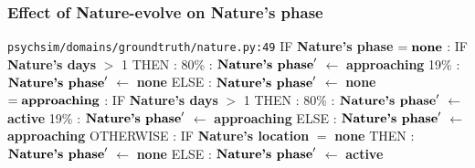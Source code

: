 \documentclass{article}%
\begin{document}
\subsubsection{Effect of Nature{-}evolve on Nature's phase}%
\label{ssubsec:Effect of Nature{-}evolve on Nature's phase}%
\begin{flushleft}%
\verb|psychsim/domains/groundtruth/nature.py:49|%
\linebreak%
IF %
\textbf{Nature's phase}%
\linebreak%
\hspace*{2em}%
$= \mbox{\textbf{none}}$%
: %
IF %
\textbf{Nature's days}%
$>$%
1%
\linebreak%
\hspace*{4em}%
THEN %
: %
\linebreak%
\hspace*{6em}%
80\%%
: %
$\mbox{\textbf{Nature's phase}} '$%
$\leftarrow$%
\textbf{approaching}%
\linebreak%
\hspace*{6em}%
19\%%
: %
$\mbox{\textbf{Nature's phase}} '$%
$\leftarrow$%
\textbf{none}%
\linebreak%
\hspace*{4em}%
ELSE %
: %
$\mbox{\textbf{Nature's phase}} '$%
$\leftarrow$%
\textbf{none}%
\linebreak%
\hspace*{2em}%
$= \mbox{\textbf{approaching}}$%
: %
IF %
\textbf{Nature's days}%
$>$%
1%
\linebreak%
\hspace*{4em}%
THEN %
: %
\linebreak%
\hspace*{6em}%
80\%%
: %
$\mbox{\textbf{Nature's phase}} '$%
$\leftarrow$%
\textbf{active}%
\linebreak%
\hspace*{6em}%
19\%%
: %
$\mbox{\textbf{Nature's phase}} '$%
$\leftarrow$%
\textbf{approaching}%
\linebreak%
\hspace*{4em}%
ELSE %
: %
$\mbox{\textbf{Nature's phase}} '$%
$\leftarrow$%
\textbf{approaching}%
\linebreak%
\hspace*{2em}%
OTHERWISE %
: %
IF %
\textbf{Nature's location}%
$=$%
\textbf{none}%
\linebreak%
\hspace*{4em}%
THEN %
: %
$\mbox{\textbf{Nature's phase}} '$%
$\leftarrow$%
\textbf{none}%
\linebreak%
\hspace*{4em}%
ELSE %
: %
$\mbox{\textbf{Nature's phase}} '$%
$\leftarrow$%
\textbf{active}%
\end{flushleft}
\end{document}
